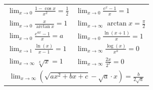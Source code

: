 \documentclass[a4paper,10pt]{article}
\def\limxo{\lim_{x\to 0}}
\def\limxi{\lim_{x\to\infty}}
\begin{document}
\begin{center}
\begin{tabularx}{\linewidth}{XX}
						$\limxo \frac{1 - \cos x}{x^2} = \frac{1}{2}$ & $\limxo \frac{e^x-1}{x} = 1$       \\
						$\limxo \frac{x}{\arctan x} = 1$              & $\limxi \arctan x = \frac{\pi}{2}$ \\
						$\limxo \frac{e^{ax}-1}{x} = a$               & $\limxo \frac{\ln(x+1)}{x} = 1$    \\
						$\lim_{x\to 1} \frac{\ln(x)}{x-1} = 1$        & $\limxi \frac{\log(x)}{x^a} = 0$   \\
						$\limxi \sqrt[x]{x} = 1$                      & $\limxi \frac{2x}{2^x} = 0$        \\
						\multicolumn{2}{c}{$\lim_{x\to \infty} \left(\sqrt{ax^2+bx+c}-\sqrt{a}\cdot x \right) = \frac{b}{2\sqrt{a}}$} \\
						\bottomrule
					\end{tabularx}
				\end{center}
				
				\newpage
				\vfill\null
				
\end{document}
